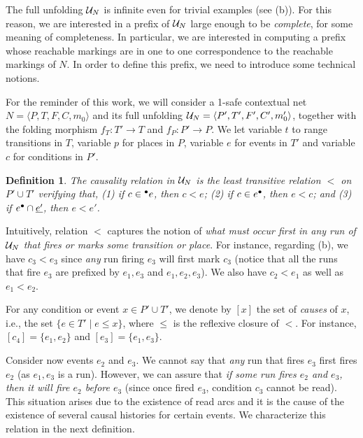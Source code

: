 \documentclass[11pt,a4paper]{article}
\newtheorem{definition}[theorem]{Definition}
\begin{document}
The full unfolding $\mathcal{U}_{N}$ is infinite even for trivial examples (see
 (b)).  For this reason, we are interested in a prefix of $\mathcal{U}_{N}$ large enough to be \emph{complete}, for some meaning of completeness.  In
particular, we are interested in computing a prefix whose reachable markings
are in one to one correspondence to the reachable markings of $N$.  In order to
define this prefix, we need to introduce some technical notions.  

For the reminder of this work, we will consider a 1-safe contextual net $N =
\langle P, T, F, C, m_0 \rangle$ and its full unfolding $\mathcal{U}_{N} = \langle P',
T', F', C', m'_0 \rangle$, together with the folding morphism $f_T : T' \to T$
and $f_P : P' \to P$.  We let variable $t$ to range transitions in $T$,
variable $p$ for places in $P$, variable $e$ for events in $T'$ and variable
$c$ for conditions in $P'$.

\begin{definition}
\label{def:causality.relation}
The \emph{causality relation} in $\mathcal{U}_{N}$ is the least transitive relation $<$
on $P' \cup T'$ verifying that, (1) if $c \in {}^\bullet e$, then $c < e$; (2) if $c
\in e^\bullet$, then $e < c$; and (3) if $e^\bullet \cap \underline{e'}$, then $e < e'$.
\end{definition}

Intuitively, relation $<$ captures the notion of \textit{what must occur first
in \emph{any} run of $\mathcal{U}_{N}$ that fires or marks some transition or place}.
For instance, regarding  (b), we have $c_3 < e_3$ since
\emph{any} run firing $e_3$ will first mark $c_3$ (notice that all the runs
that fire $e_3$ are prefixed by $e_1, e_3$ and $e_1, e_2, e_3$).  We also have
$c_2 < e_1$ as well as $e_1 < e_2$.

For any condition or event $x \in P' \cup T'$, we denote by $[x]$ the set of
\emph{causes} of $x$, i.e., the set $\{e \in T' \mid e \le x\}$, where $\le$ is
the reflexive closure of $<$.  For instance, $[c_4] = \{e_1, e_2\}$ and $[e_3]
= \{e_1, e_3\}$.

Consider now events $e_2$ and $e_3$.  We cannot say that \emph{any} run that
fires $e_3$ first fires $e_2$ (as $e_1, e_3$ is a run).  However, we can assure
that \emph{if some run fires $e_2$ and $e_3$, then it will fire $e_2$ before
$e_3$} (since once fired $e_3$, condition $c_3$ cannot be read).  This
situation arises due to the existence of read arcs and it is the cause of the
existence of several causal histories for certain events.  We characterize this
relation in the next definition.
\end{document}
